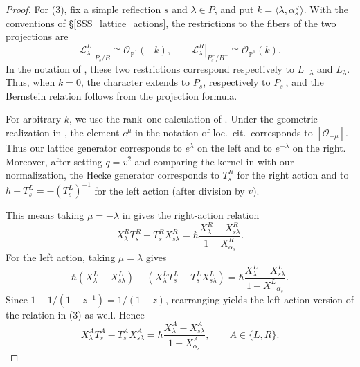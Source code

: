 \documentclass{amsart}
\theoremstyle{definition}
\numberwithin{equation}{section}
\begin{document}
\begin{proof}
For (3), fix a simple reflection $s$ and $\lambda\in P$, and put
$k=\langle\lambda,\alpha_s^\vee\rangle$. With the conventions
of \S\ref{SSS_lattice_actions}, the restrictions to the fibers of the
two projections are
\[
\left.\mathcal L_\lambda^L\right|_{P_s/B}
    \cong \mathcal O_{\mathbb P^1}(-k),
\qquad
\left.\mathcal L_\lambda^R\right|_{P_s^-/B^-}
    \cong \mathcal O_{\mathbb P^1}(k).
\]
In the notation of
\cite[(7.6.36)]{CG}, these two restrictions correspond respectively to $L_{-\lambda}$ and $L_{\lambda}$.
Thus, when $k=0$, the character extends to $P_s$, respectively to
$P_s^-$, and the Bernstein relation follows from the projection formula.

For arbitrary $k$, we use the rank--one calculation of
\cite[Lemma~7.1.10]{CG}. Under the geometric realization in
\cite[(7.6.1)]{CG}, the element $e^\mu$ in the notation of loc.\ cit.\ corresponds
to $[\mathcal O_{-\mu}]$. Thus our lattice generator corresponds to
$e^\lambda$ on the left and to $e^{-\lambda}$ on the right. Moreover,
after setting $q=v^2$ and comparing the kernel in \cite[(7.6.1)]{CG}
with our normalization, the Hecke
generator corresponds to $T_s^R$ for the right action and to
$\hbar-T_s^L=-(T_s^L)^{-1}$ for the left action (after division by $v$).

This means taking $\mu=-\lambda$ in
\cite[Lemma~7.1.10]{CG} gives the right-action relation
\[
X_\lambda^R T_s^R-T_s^R X_{s\lambda}^R
  =\hbar\frac{X_\lambda^R-X_{s\lambda}^R}
  {1-X_{\alpha_s}^R}.
\]
For the left action, taking $\mu=\lambda$ gives
\[
\hbar(X_\lambda^L-X_{s\lambda}^L)
  -(X_\lambda^L T_s^L-T_s^L X_{s\lambda}^L)
  =\hbar\frac{X_\lambda^L-X_{s\lambda}^L}
  {1-X_{-\alpha_s}^L}.
\]
Since $1-1/(1-z^{-1})=1/(1-z)$, rearranging yields the left-action version of the
relation in (3) as well. Hence
\[
X_\lambda^A T_s^A-T_s^A X_{s\lambda}^A
  =\hbar\frac{X_\lambda^A-X_{s\lambda}^A}
  {1-X_{\alpha_s}^A},\qquad A\in\{L,R\}.
\]
\end{proof}
\end{document}

